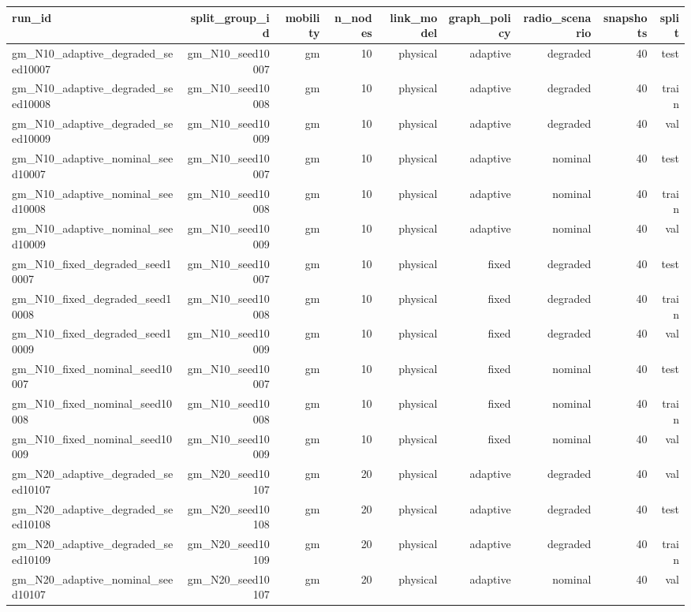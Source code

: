 \begin{tabular}{lrrrrrrrr}
\toprule
run\_id & split\_group\_id & mobility & n\_nodes & link\_model & graph\_policy & radio\_scenario & snapshots & split \\
\midrule
gm\_N10\_adaptive\_degraded\_seed10007 & gm\_N10\_seed10007 & gm & 10 & physical & adaptive & degraded & 40 & test \\
gm\_N10\_adaptive\_degraded\_seed10008 & gm\_N10\_seed10008 & gm & 10 & physical & adaptive & degraded & 40 & train \\
gm\_N10\_adaptive\_degraded\_seed10009 & gm\_N10\_seed10009 & gm & 10 & physical & adaptive & degraded & 40 & val \\
gm\_N10\_adaptive\_nominal\_seed10007 & gm\_N10\_seed10007 & gm & 10 & physical & adaptive & nominal & 40 & test \\
gm\_N10\_adaptive\_nominal\_seed10008 & gm\_N10\_seed10008 & gm & 10 & physical & adaptive & nominal & 40 & train \\
gm\_N10\_adaptive\_nominal\_seed10009 & gm\_N10\_seed10009 & gm & 10 & physical & adaptive & nominal & 40 & val \\
gm\_N10\_fixed\_degraded\_seed10007 & gm\_N10\_seed10007 & gm & 10 & physical & fixed & degraded & 40 & test \\
gm\_N10\_fixed\_degraded\_seed10008 & gm\_N10\_seed10008 & gm & 10 & physical & fixed & degraded & 40 & train \\
gm\_N10\_fixed\_degraded\_seed10009 & gm\_N10\_seed10009 & gm & 10 & physical & fixed & degraded & 40 & val \\
gm\_N10\_fixed\_nominal\_seed10007 & gm\_N10\_seed10007 & gm & 10 & physical & fixed & nominal & 40 & test \\
gm\_N10\_fixed\_nominal\_seed10008 & gm\_N10\_seed10008 & gm & 10 & physical & fixed & nominal & 40 & train \\
gm\_N10\_fixed\_nominal\_seed10009 & gm\_N10\_seed10009 & gm & 10 & physical & fixed & nominal & 40 & val \\
gm\_N20\_adaptive\_degraded\_seed10107 & gm\_N20\_seed10107 & gm & 20 & physical & adaptive & degraded & 40 & val \\
gm\_N20\_adaptive\_degraded\_seed10108 & gm\_N20\_seed10108 & gm & 20 & physical & adaptive & degraded & 40 & test \\
gm\_N20\_adaptive\_degraded\_seed10109 & gm\_N20\_seed10109 & gm & 20 & physical & adaptive & degraded & 40 & train \\
gm\_N20\_adaptive\_nominal\_seed10107 & gm\_N20\_seed10107 & gm & 20 & physical & adaptive & nominal & 40 & val \\

\end{tabular}
